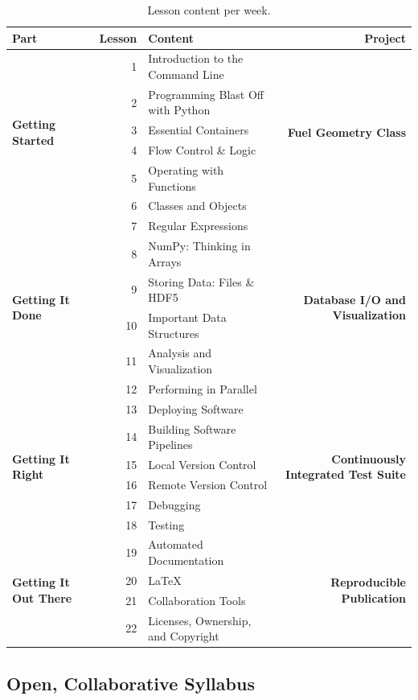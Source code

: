 \documentclass{anstrans}
\begin{document}
\begin{table}[t]
\centering
\begin{tabular}{|l|r|l|r|}
\hline
\textbf{Part} & \textbf{Lesson} & \textbf{Content} & \textbf{Project} \\
\hline
\multirow{6}{*}{\textbf{Getting Started}}
& 1 & Introduction to the Command Line
& \multirow{6}{*}{\textbf{Fuel Geometry Class}}\\
& 2 & Programming Blast Off with Python & \\
& 3 & Essential Containers & \\
& 4 & Flow Control \& Logic & \\
& 5 & Operating with Functions & \\
& 6 & Classes and Objects & \\
\hline
\multirow{6}{*}{\textbf{Getting It Done}}
& 7 & Regular Expressions
& \multirow{6}{*}{\textbf{Database I/O and Visualization}}\\
& 8 & NumPy: Thinking in Arrays & \\
& 9 & Storing Data: Files \& HDF5 & \\
& 10 & Important Data Structures & \\
& 11 & Analysis and Visualization & \\
& 12 & Performing in Parallel & \\
\hline
\multirow{6}{*}{\textbf{Getting It Right}}
& 13 & Deploying Software
& \multirow{6}{*}{\textbf{Continuously Integrated Test Suite}}\\
& 14 & Building Software Pipelines & \\
& 15 & Local Version Control & \\
& 16 & Remote Version Control & \\
& 17 & Debugging & \\
& 18 & Testing & \\
\hline
\multirow{4}{*}{\textbf{Getting It Out There}}
& 19 & Automated Documentation
& \multirow{4}{*}{\textbf{Reproducible Publication}}\\
& 20 & LaTeX & \\
& 21 & Collaboration Tools& \\
& 22 & Licenses, Ownership, and Copyright & \\
\hline
\end{tabular}
\caption{Lesson content per week.}
\label{tab:syllabus}
\end{table}



\subsection{Open, Collaborative Syllabus}
\end{document}
